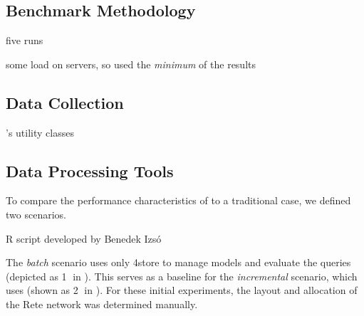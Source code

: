 \subsection{Benchmark Methodology}

five runs

some load on servers, so used the \emph{minimum} of the results

\subsection{Data Collection}

\tb{}'s utility classes

\subsection{Data Processing Tools}

To compare the performance characteristics of \iqd{} to a traditional case, we defined two scenarios. 

R script \cite{RProject} developed by Benedek Izsó 

The \textit{batch} scenario uses only 4store to manage models and evaluate the queries (depicted as \textcircled{1} in ). This serves as a baseline for the \textit{incremental} scenario, which uses \iqd{} (shown as \textcircled{2} in ). For these initial experiments, the layout and allocation of the Rete network was determined manually. 

